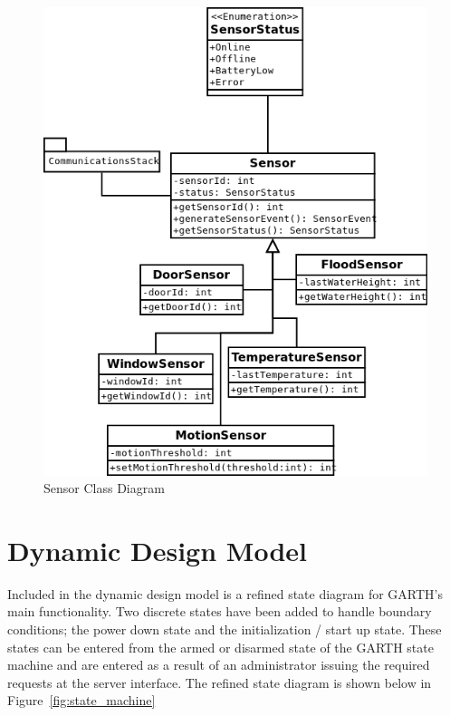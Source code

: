 \documentclass{report}
\begin{document}
\begin{figure}[p]
    \centering
    \label{fig:sensor_class_diagram}
    \caption{Sensor Class Diagram}
    \includegraphics[scale=0.5]{sensor_class_diagram}
\end{figure}

\section{Dynamic Design Model}

Included in the dynamic design model is a refined state diagram for GARTH's
main functionality. Two discrete states have been added to handle boundary
conditions; the power down state and the initialization / start up state. These
states can be entered from the armed or disarmed state of the GARTH state
machine and are entered as a result of an administrator issuing the required
requests at the server interface. The refined state diagram is shown below in
Figure~\ref{fig:state_machine}
\end{document}
